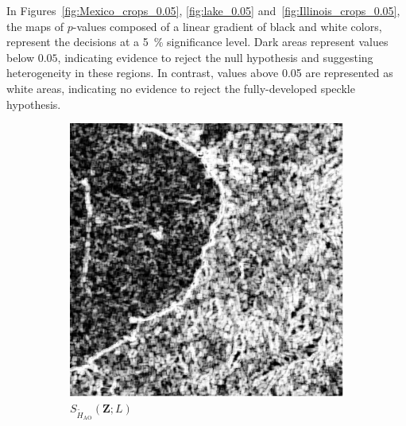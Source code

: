 In Figures~\ref{fig:Mexico_crops_0.05}, \ref{fig:lake_0.05}
and~\ref{fig:Illinois_crops_0.05}, the maps of \(p\)-values composed of
a linear gradient of black and white colors, represent the decisions at
a \SI{5}{\percent} significance level.
Dark areas represent values below
\(0.05\), indicating evidence to reject the null hypothesis and
suggesting heterogeneity in these regions. 
In contrast, values above 0.05 are represented as white areas, indicating no evidence to reject
the fully-developed speckle hypothesis.
\begin{figure}[H]
  \centering
  \begin{subfigure}[b]{0.3\textwidth}
    \centering
    \includegraphics[width=\textwidth]{../../Figures/PNG/Entropy_Mexico_512_18L_AO_200b}
    \caption{$S_{\widetilde{H}_{\text{AO}}}(\bm{Z}; L)$}
    \label{fig:real_images_test_Mexico-1}
  \end{subfigure}
  \hfill
  \begin{subfigure}[b]{0.3\textwidth}
    \centering

\end{subfigure}
\end{figure}
